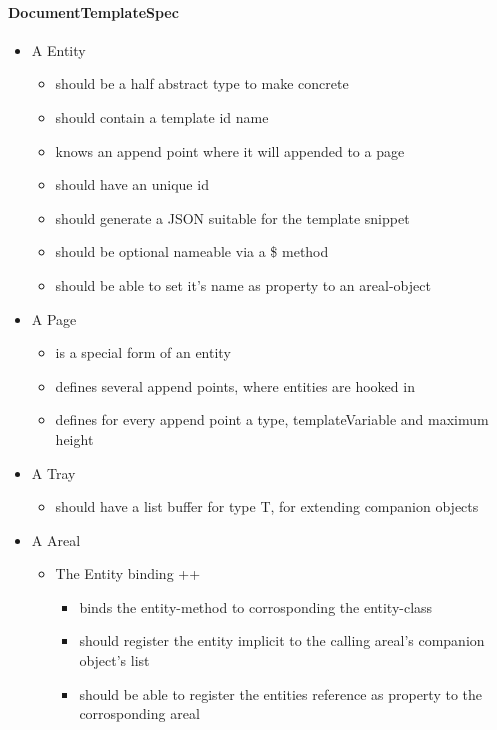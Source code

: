 \paragraph{DocumentTemplateSpec}

\begin{itemize}
  \item A Entity
  \begin{itemize}
    \item should be a half abstract type to make concrete
    \item should contain a template id name
    \item knows an append point where it will appended to a page
    \item should have an unique id
    \item should generate a JSON suitable for the template snippet
    \item should be optional nameable via a \$ method
    \item should be able to set it's name as property to an areal-object
  \end{itemize}
  \item A Page 
  \begin{itemize}
    \item is a special form of an entity
    \item defines several append points, where entities are hooked in
    \item defines for every append point a type, templateVariable and maximum height
  \end{itemize}
  \item A Tray 
  \begin{itemize}
    \item should have a list buffer for type T, for extending companion objects
  \end{itemize}
  \item A Areal 
  \begin{itemize}
    \item The Entity binding ++ 
    \begin{itemize}
      \item binds the entity-method to corrosponding the entity-class
      \item should register the entity implicit to the calling areal's companion object's list
      \item should be able to register the entities reference as property to the corrosponding areal
      \end{itemize}

\end{itemize}
\end{itemize}
